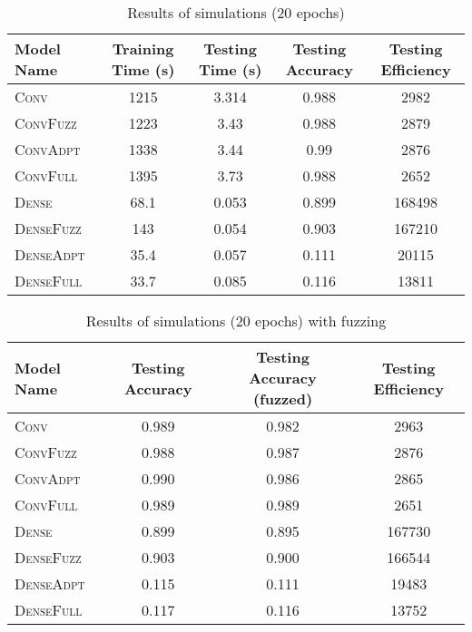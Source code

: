 \documentclass{article}
\begin{document}
\begin{table}[h]
  \caption{Results of simulations (20 epochs)}
  \label{tbl:results3}
  \centering
  \begin{tabular}{lSSSS}
    \toprule
    {Model Name} & {Training Time (s)} & {Testing Time (s)} & {Testing Accuracy} & {Testing Efficiency} \\
    \midrule
    {\textsc{Conv}}         & 1215 & 3.314 & 0.988 & 2982 \\
    {\textsc{ConvFuzz}}     & 1223 & 3.43 & 0.988 & 2879 \\
    {\textsc{ConvAdpt}}     & 1338 & 3.44 & 0.99 & 2876 \\
    {\textsc{ConvFull}}     & 1395 & 3.73 & 0.988 & 2652 \\
    {\textsc{Dense}}        & 68.1 & 0.053 & 0.899 & 168498 \\
    {\textsc{DenseFuzz}}    & 143 & 0.054 & 0.903 & 167210 \\
    {\textsc{DenseAdpt}}    & 35.4 & 0.057 & 0.111 & 20115 \\
    {\textsc{DenseFull}}    & 33.7 & 0.085 & 0.116 & 13811 \\
    \bottomrule
  \end{tabular}
\end{table}

\begin{table}[h]
  \caption{Results of simulations (20 epochs) with fuzzing}
  \label{tbl:results4}
  \centering
  \begin{tabular}{lSSS}
    \toprule
    {Model Name} & {Testing Accuracy} & {Testing Accuracy (fuzzed)} & {Testing Efficiency} \\
    \midrule
    {\textsc{Conv}}         & 0.989 & 0.982 & 2963 \\
    {\textsc{ConvFuzz}}     & 0.988 & 0.987 & 2876 \\
    {\textsc{ConvAdpt}}     & 0.990 & 0.986 & 2865 \\
    {\textsc{ConvFull}}     & 0.989 & 0.989 & 2651 \\
    {\textsc{Dense}}        & 0.899 & 0.895 & 167730 \\
    {\textsc{DenseFuzz}}    & 0.903 & 0.900 & 166544 \\
    {\textsc{DenseAdpt}}    & 0.115 & 0.111 & 19483 \\
    {\textsc{DenseFull}}    & 0.117 & 0.116 & 13752 \\
    \bottomrule
  \end{tabular}
\end{table}
\end{document}
